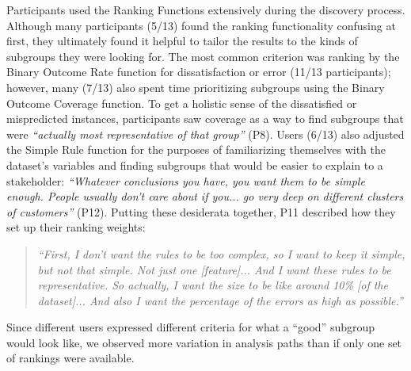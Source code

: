 Participants used the Ranking Functions extensively during the discovery process.
Although many participants (5/13) found the ranking functionality confusing at first, they ultimately found it helpful to tailor the results to the kinds of subgroups they were looking for.
The most common criterion was ranking by the Binary Outcome Rate function for dissatisfaction or error (11/13 participants); however, many (7/13) also spent time prioritizing subgroups using the Binary Outcome Coverage function.
To get a holistic sense of the dissatisfied or mispredicted instances, participants saw coverage as a way to find subgroups that were \textit{``actually most representative of that group''} (P8).
Users (6/13) also adjusted the Simple Rule function for the purposes of familiarizing themselves with the dataset's variables and finding subgroups that would be easier to explain to a stakeholder: \textit{``Whatever conclusions you have, you want them to be simple enough. People usually don't care about if you... go very deep on different clusters of customers''} (P12).
Putting these desiderata together, P11 described how they set up their ranking weights:
\begin{quote}
\textit{``First, I don't want the rules to be too complex, so I want to keep it simple, but not that simple. Not just one [feature]... And I want these rules to be representative. So actually, I want the size to be like around 10\% [of the dataset]... And also I want the percentage of the errors as high as possible.''}
\end{quote}
Since different users expressed different criteria for what a ``good'' subgroup would look like, we observed more variation in analysis paths than if only one set of rankings were available.

